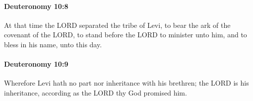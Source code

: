 		\paragraph{Deuteronomy 10:8} %
			\label{DEUTERONOMY-10-8}

			At that time the LORD separated the tribe of Levi, to bear the ark of the covenant of the LORD, to stand before the LORD to minister unto him, and to bless in his name, unto this day.


		\paragraph{Deuteronomy 10:9} %
			\label{DEUTERONOMY-10-9}

			Wherefore Levi hath no part nor inheritance with his brethren; the LORD is his inheritance, according as the LORD thy God promised him.


